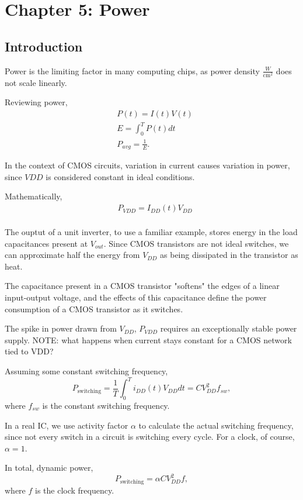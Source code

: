 \documentclass{article}
\begin{document}
\setcounter{section}{4}
\section{Chapter 5: Power} 
\setcounter{subsection}{0}
\subsection{Introduction}
Power is the limiting factor in many computing chips, as power density \(\frac{W}{\mathrm{cm}^2}\) does not scale linearly.

Reviewing power, 
\begin{align*}
  &P(t) = I(t)V(t) \\
	&E = \int_{0}^{T}P(t)dt \\
	&P_{avg} = \frac{1}{E}.
\end{align*}

In the context of CMOS circuits, variation in current causes variation in power, since \(VDD\) is considered constant in ideal conditions.

Mathematically,
\begin{align*}
	& P_{VDD} = I_{DD}(t)V_{DD}\\ 
\end{align*}

The ouptut of a unit inverter, to use a familiar example, stores energy in the load capacitances present at \(V_{out}\). Since CMOS transistors are not ideal switches, we can approximate half the energy from \(V_{DD}\) as being dissipated in the transistor as heat.

The capacitance present in a CMOS transistor "softens" the edges of a linear input-output voltage, and the effects of this capacitance define the power consumption of a CMOS transistor as it switches.

The spike in power drawn from \(V_{DD}\), \(P_{VDD}\) requires an exceptionally stable power supply. NOTE: what happens when current stays constant for a CMOS network tied to VDD? 

Assuming some constant switching frequency, 
\[
	P_{\mathrm{switching}} = \frac{1}{T}\int_{0}^{T}i_{DD}(t)V_{DD}dt = CV_{DD}^2f_{sw},
\]
where \(f_{sw}\) is the constant switching frequency.

In a real IC, we use activity factor \(\alpha\) to calculate the actual switching frequency, since not every switch in a circuit is switching every cycle. For a clock, of course, \(\alpha = 1\). 

In total, dynamic power, 
\[
  P_{\mathrm{switching}} = \alpha CV^2_{DD}f,
\]
where \(f\) is the clock frequency.
\end{document}
